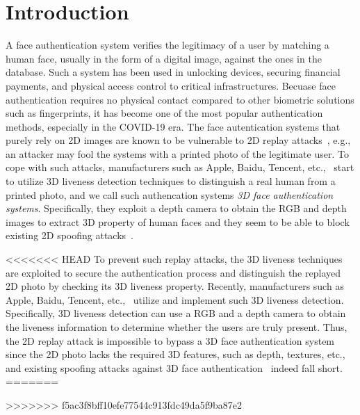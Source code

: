 \section{Introduction}
A face authentication system verifies the legitimacy of a user by matching a human face, usually in the form of a digital image, against the ones in the database. Such a system has been used in unlocking devices, securing financial payments, and physical access control to critical infrastructures. Becuase face authentication requires no physical contact compared to other biometric solutions such as fingerprints, it has become one of the most popular authentication methods, especially in the COVID-19 era. The face autentication systems that purely rely on 2D images are known to be vulnerable to 2D replay attacks~\cite{chakka2011competition,anjos2011counter,raghavendra2015presentation}, e.g., an attacker may fool the systems with a printed photo of the legitimate user.
To cope with such attacks, manufacturers such as Apple, Baidu, Tencent, etc.,~\cite{faceid, baidu, tencent} start to utilize 3D liveness detection techniques to distinguish a real human from a printed photo, and we call such authencation systems \textit{3D face authentication systems}. Specifically, they exploit a depth camera to obtain the RGB and depth images to extract 3D property of human faces and they seem to be able to block existing 2D spoofing attacks~\cite{souza2018far, marcel2014handbook}.


<<<<<<< HEAD
To prevent such replay attacks, the 3D liveness techniques are exploited to secure the authentication process and distinguish the replayed 2D photo by checking its 3D liveness property. Recently, manufacturers such as Apple, Baidu, Tencent, etc.,~\cite{faceid, baidu, tencent} utilize and implement such 3D liveness detection. 
Specifically, 3D liveness detection can use a RGB and a depth camera to obtain the liveness information to determine whether the users are truly present. Thus, the 2D replay attack is impossible to bypass a 3D face authentication system since the 2D photo lacks the required 3D features, such as depth, textures, etc.,  and existing spoofing attacks against 3D face authentication~\cite{souza2018far, marcel2014handbook} indeed fall short.
=======

>>>>>>> f5ac3f8bff10efe77544c913fdc49da5f9ba87e2

